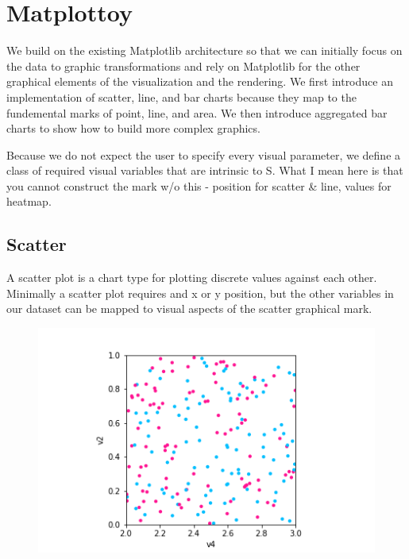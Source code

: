 \documentclass[../main.tex]{subfiles}
\begin{document}
    

\section{Matplottoy}

We build on the existing Matplotlib architecture \cite{hunterMatplotlib2DGraphics2007} so that we can initially focus on the data to graphic transformations and rely on Matplotlib for the other graphical elements of the visualization and the rendering. We first introduce an implementation of scatter, line, and bar charts because they map to the fundemental marks of point, line, and area. We then introduce aggregated bar charts to show how to build more complex graphics.  

Because we do not expect the user to specify every visual parameter, we define a class of required visual variables that are intrinsic to S. %
What I mean here is that you cannot construct the mark w/o this - position for scatter \& line, values for heatmap. 

\subsection{Scatter}
 A scatter plot \cite{friendlyBriefHistoryData2006a,tukeyExploratoryDataAnalysis1977} is a chart type for plotting discrete values against each other. Minimally a scatter plot requires and x or y position, but the other variables in our dataset can be mapped to visual aspects of the scatter graphical mark. 
\begin{figure}[H]
    \includegraphics[width=\textwidth]{figures/code/scatter_0.png}
    \label{fig:scatter}
\end{figure}
\end{document}
